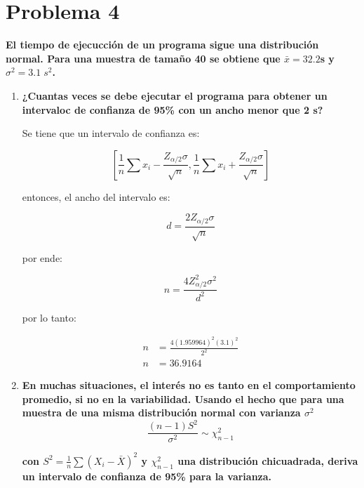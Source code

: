 \section*{Problema 4}

\textbf{El tiempo de ejecucción de un programa sigue una distribución normal. Para una muestra de tamaño 40 se obtiene que $\bar{x}=32.2$s y $\sigma^2=3.1\; s^2$.}

\begin{enumerate}
    \item \textbf{¿Cuantas veces se debe ejecutar el programa para obtener un intervaloc de confianza de 95\% con un ancho menor que 2 s?}

          Se tiene que un intervalo de confianza es:

          \begin{equation*}
              \left [ \frac{1}{n} \sum x_i - \frac{Z_{\alpha/2}\sigma}{\sqrt{n}},\frac{1}{n} \sum x_i + \frac{Z_{\alpha/2}\sigma}{\sqrt{n}} \right ]
          \end{equation*}

          entonces, el ancho del intervalo es:

          \begin{equation*}
              d = \frac{2Z_{\alpha/2}\sigma}{\sqrt{n}}
          \end{equation*}

          por ende:

          \begin{equation*}
              n = \frac{4Z_{\alpha/2}^2\sigma^2}{d^2}
          \end{equation*}

          por lo tanto:

          \begin{align*}
              n & = \frac{4(1.959964)^2(3.1)^2}{2^2} \\
              n & = 36.9164
          \end{align*}

    \item \textbf{En muchas situaciones, el interés no es tanto en el comportamiento promedio, si no en la variabilidad. Usando el hecho que para una muestra de una misma distribución normal con varianza $\sigma^2$}
          \begin{equation*}
              \frac{(n-1)S^2}{\sigma^2} \sim \chi_{n-1}^2
          \end{equation*}

          \textbf{con $S^2 = \frac{1}{n}\sum (X_i-\bar{X})^2$ y $\chi_{n-1}^2$ una distribución chicuadrada, deriva un intervalo de confianza de 95\% para la varianza.}


\end{enumerate}
